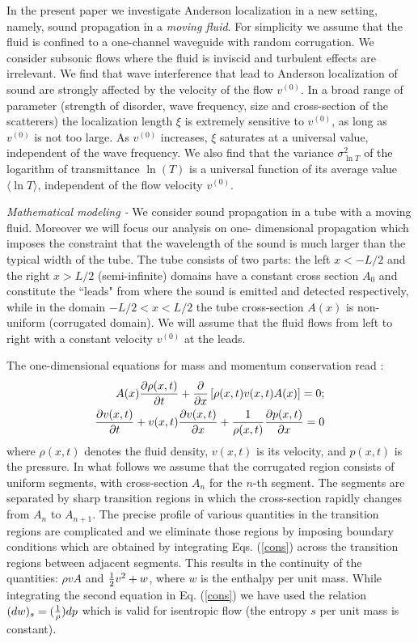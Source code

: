 \documentclass[aps,prl,twocolumn,groupedaddress,amsmath,amssymb]{revtex4}
\begin{document}
In the present paper we investigate Anderson localization in a new setting, namely, sound propagation in a {\it moving fluid}. For simplicity
we assume that the fluid is confined to a one-channel waveguide with random corrugation. We consider subsonic flows where the fluid
is inviscid and turbulent effects are irrelevant. We find that wave interference that lead to Anderson localization of sound are strongly
affected by the velocity of the flow $v^{(0)}$.  In a broad range of parameter (strength of disorder, wave frequency, size and cross-section
of the scatterers) the localization length $\xi$ is extremely sensitive to $v^{(0)}$, as long as $v^{(0)}$ is not too large. As $v^{(0)}$ increases,
$\xi$ saturates at a universal value, independent of the wave frequency. We also find that the variance $\sigma_{\ln T}^2$ of the logarithm 
of transmittance $\ln(T)$ is a universal function of its average value $\langle\ln T\rangle$, independent of the  flow velocity $v^{(0)}$.

{\it Mathematical modeling - } We consider sound propagation in a tube with a moving fluid. Moreover we will focus our analysis on one-
dimensional propagation which imposes the constraint that the wavelength of the sound is much larger than the typical width of 
the tube. The tube consists of two parts: the left $x<-L/2$ and the right $x>L/2$ (semi-infinite) domains have a constant cross section 
$A_0$ and constitute the ``leads" from where the sound is emitted and detected respectively, while in the domain $-L/2<x<L/2$ the tube 
cross-section $A(x)$ is non-uniform (corrugated domain). We will assume that the fluid flows from left to right with a constant velocity 
$v^{(0)}$ at the leads.

The one-dimensional equations for mass and momentum conservation read \cite{Landau}:
\begin{eqnarray}
\label{cons}
A(x){\partial \rho(x,t)\over \partial t} +{\partial \over \partial x}\left[\rho(x,t) v(x,t) A(x)\right]=0; &\\
{\partial v(x,t)\over\partial t} +v(x,t) {\partial v(x,t)\over \partial x}+{1 \over \rho(x,t)}{\partial p(x,t)\over \partial x} = 0&\nonumber
\end{eqnarray}
where $\rho(x,t)$ denotes the fluid density, $v(x,t)$ is its velocity, and $p(x,t)$ is the pressure. In what follows we assume that the corrugated
region consists of uniform segments, with cross-section $A_n$ for the $n$-th segment. The segments are separated by sharp transition 
regions in which the cross-section rapidly changes from $A_n$ to $A_{n+1}$. The precise profile of various quantities in the transition
regions are complicated and we eliminate those regions by imposing boundary conditions which are obtained by integrating Eqs. (\ref{cons})
across the transition regions between adjacent segments. This results in the continuity of the quantities: $\rho v A$ and ${1\over 2} v^2+w$, 
where $w$ is the enthalpy per unit mass. While integrating the second equation in Eq. (\ref{cons}) we have used the relation
$(dw)_s = ({1\over \rho}) {dp}$ which is valid for isentropic flow (the entropy $s$ per unit mass is constant).
\end{document}
